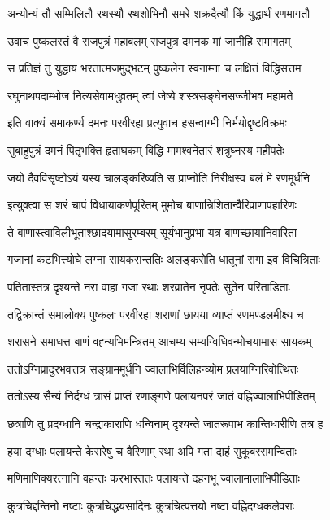 \twolineshloka
{अन्योन्यं तौ सम्मिलितौ रथस्थौ रथशोभिनौ}
{समरे शक्रदैत्यौ किं युद्धार्थं रणमागतौ}%

\twolineshloka
{उवाच पुष्कलस्तं वै राजपुत्रं महाबलम्}
{राजपुत्र दमनक मां जानीहि समागतम्}%

\twolineshloka
{स प्रतिज्ञं तु युद्धाय भरतात्मजमुद्भटम्}
{पुष्कलेन स्वनाम्ना च लक्षितं विद्धिसत्तम}%

\twolineshloka
{रघुनाथपदाम्भोज नित्यसेवामधुव्रतम्}
{त्वां जेष्ये शस्त्रसङ्घेनसज्जीभव महामते}%

\twolineshloka
{इति वाक्यं समाकर्ण्य दमनः परवीरहा}
{प्रत्युवाच हसन्वाग्मी निर्भयोद्दृष्टविक्रमः}%

\twolineshloka
{सुबाहुपुत्रं दमनं पितृभक्ति हृताघकम्}
{विद्धि मामश्वनेतारं शत्रुघ्नस्य महीपतेः}%

\twolineshloka
{जयो दैवविसृष्टोऽयं यस्य चालङ्करिष्यति}
{स प्राप्नोति निरीक्षस्व बलं मे रणमूर्धनि}%

\twolineshloka
{इत्युक्त्वा स शरं चापं विधायाकर्णपूरितम्}
{मुमोच बाणान्निशितान्वैरिप्राणापहारिणः}%

\twolineshloka
{ते बाणास्त्वाविलीभूताश्छादयामासुरम्बरम्}
{सूर्यभानुप्रभा यत्र बाणच्छायानिवारिता}%

\twolineshloka
{गजानां कटभित्त्योघे लग्ना सायकसन्ततिः}
{अलङ्करोति धातूनां रागा इव विचित्रिताः}%

\twolineshloka
{पतितास्तत्र दृश्यन्ते नरा वाहा गजा रथाः}
{शरव्रातेन नृपतेः सुतेन परिताडिताः}%

\twolineshloka
{तद्विक्रान्तं समालोक्य पुष्कलः परवीरहा}
{शराणां छायया व्याप्तं रणमण्डलमीक्ष्य च}%

\twolineshloka
{शरासने समाधत्त बाणं वह्न्यभिमन्त्रितम्}
{आचम्य सम्यग्विधिवन्मोचयामास सायकम्}%

\twolineshloka
{ततोऽग्निप्रादुरभवत्तत्र सङ्ग्राममूर्धनि}
{ज्वालाभिर्विलिहन्व्योम प्रलयाग्निरिवोत्थितः}%

\twolineshloka
{ततोऽस्य सैन्यं निर्दग्धं त्रासं प्राप्तं रणाङ्गणे}
{पलायनपरं जातं वह्निज्वालाभिपीडितम्}%

\twolineshloka
{छत्राणि तु प्रदग्धानि चन्द्राकाराणि धन्विनाम्}
{दृश्यन्ते जातरूपाभ कान्तिधारीणि तत्र ह}%

\twolineshloka
{हया दग्धाः पलायन्ते केसरेषु च वैरिणाम्}
{रथा अपि गता दाहं सुकूबरसमन्विताः}%

\twolineshloka
{मणिमाणिक्यरत्नानि वहन्तः करभास्ततः}
{पलायन्ते दहनभू ज्वालामालाभिपीडिताः}%

\twolineshloka
{कुत्रचिद्दन्तिनो नष्टाः कुत्रचिद्धयसादिनः}
{कुत्रचित्पत्तयो नष्टा वह्निदग्धकलेवराः}%

